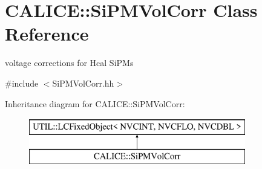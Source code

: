 \section{C\-A\-L\-I\-C\-E\-:\-:Si\-P\-M\-Vol\-Corr Class Reference}
\label{classCALICE_1_1SiPMVolCorr}


voltage corrections for Hcal Si\-P\-Ms  




{\ttfamily \#include $<$Si\-P\-M\-Vol\-Corr.\-hh$>$}

Inheritance diagram for C\-A\-L\-I\-C\-E\-:\-:Si\-P\-M\-Vol\-Corr\-:\begin{figure}[H]
\begin{center}
\leavevmode
\includegraphics[height=2.000000cm]{classCALICE_1_1SiPMVolCorr}
\end{center}
\end{figure}
